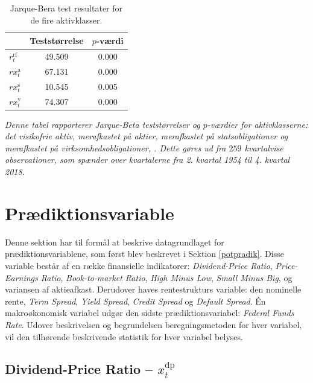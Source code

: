 \documentclass[
  a4paper,
  oneside]{memoir}
\begin{document}
\begin{table}[H]

\caption{\label{tab:JB-AKTIVKLASSE}Jarque-Bera test resultater for de fire aktivklasser.}
\centering
\begin{threeparttable}
\begin{tabular}[t]{lcc}
\toprule
  & Teststørrelse & $p$-værdi\\
\midrule
\rowcolor{gray!6}  $r_t^{\text{rf}}$ & 49.509 & 0.000\\
$rx_t^{\text{a}}$ & 67.131 & 0.000\\
\rowcolor{gray!6}  $rx_t^{\text{s}}$ & 10.545 & 0.005\\
$rx_t^{\text{v}}$ & 74.307 & 0.000\\
\bottomrule
\end{tabular}
\begin{tablenotes}
\item \textit{Denne tabel rapporterer Jarque-Beta teststørrelser og $p$-værdier for aktivklasserne: det risikofrie aktiv, merafkastet på aktier, merafkastet på statsobligationer og merafkastet på virksomhedsobligationer, \citep{Jarque1980}. Dette gøres ud fra $259$ kvartalvise observationer, som spænder over kvartalerne fra 2. kvartal 1954 til 4. kvartal 2018.}
\end{tablenotes}
\end{threeparttable}
\end{table}

\hypertarget{pvariable}{%
\section{Prædiktionsvariable}\label{pvariable}}

Denne sektion har til formål at beskrive datagrundlaget for prædiktionsvariablene, som først blev beskrevet i Sektion \ref{potpradik}. Disse variable består af en række finansielle indikatorer: \emph{Dividend-Price Ratio}, \emph{Price-Earnings Ratio}, \emph{Book-to-market Ratio}, \emph{High Minus Low}, \emph{Small Minus Big}, og variansen af aktieafkast. Derudover haves rentestrukturs variable: den nominelle rente, \emph{Term Spread}, \emph{Yield Spread}, \emph{Credit Spread} og \emph{Default Spread}. Én makroøkonomisk variabel udgør den sidste prædiktionsvariabel: \emph{Federal Funds Rate}. Udover beskrivelsen og begrundelsen beregningsmetoden for hver variabel, vil den tilhørende beskrivende statistik for hver variabel belyses.

\hypertarget{dividend-price-ratio-x_ttextdp}{%
\subsection{\texorpdfstring{Dividend-Price Ratio -- \(x_t^{\text{dp}}\)}{Dividend-Price Ratio -- x\_t\^{}\{\textbackslash text\{dp\}\}}}\label{dividend-price-ratio-x_ttextdp}}
\end{document}
